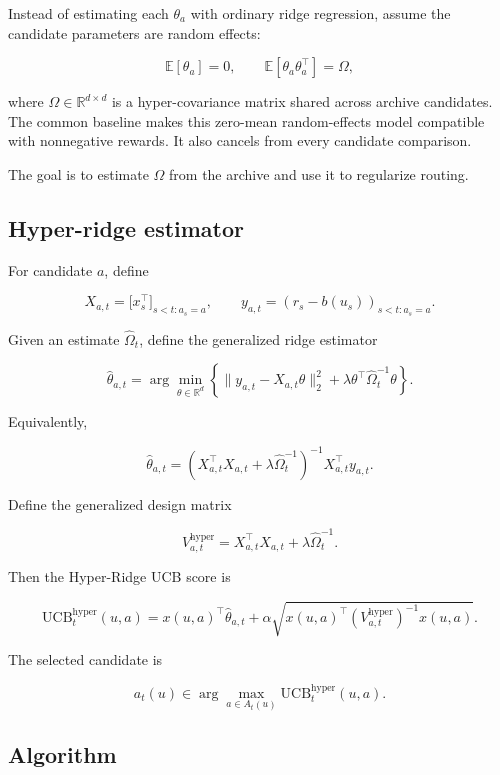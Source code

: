 \documentclass{article} %
\begin{document}
Instead of estimating each $\theta_a$ with ordinary ridge regression, assume
the candidate parameters are random effects:

\[
\mathbb{E}[\theta_a]=0,\qquad
\mathbb{E}[\theta_a\theta_a^\top]=\Omega,
\]

where $\Omega \in \mathbb{R}^{d \times d}$ is a hyper-covariance matrix shared
across archive candidates. The common baseline makes this zero-mean random-effects model compatible with nonnegative rewards. It also cancels from every candidate comparison.

The goal is to estimate $\Omega$ from the archive and use it to regularize
routing.

\subsection{Hyper-ridge estimator}

For candidate $a$, define

\[
X_{a,t} = \bigl[ x_s^\top \bigr]_{s < t : a_s = a}, \qquad
y_{a,t} = (r_s-b(u_s))_{s < t : a_s = a}.
\]

Given an estimate $\widehat{\Omega}_t$, define the generalized ridge estimator

\[
\widehat{\theta}_{a,t}
= \arg\min_{\theta \in \mathbb{R}^d}
\left\{ \| y_{a,t} - X_{a,t}\theta \|_2^2
      + \lambda \theta^\top \widehat{\Omega}_t^{-1} \theta \right\}.
\]

Equivalently,

\[
\widehat{\theta}_{a,t}
= \left( X_{a,t}^\top X_{a,t} + \lambda \widehat{\Omega}_t^{-1} \right)^{-1}
  X_{a,t}^\top y_{a,t}.
\]

Define the generalized design matrix

\[
V_{a,t}^{\mathrm{hyper}} = X_{a,t}^\top X_{a,t} + \lambda \widehat{\Omega}_t^{-1}.
\]

Then the Hyper-Ridge UCB score is

\[
\mathrm{UCB}_t^{\mathrm{hyper}}(u, a)
= x(u, a)^\top \widehat{\theta}_{a,t}
+ \alpha \sqrt{ x(u, a)^\top \left( V_{a,t}^{\mathrm{hyper}} \right)^{-1} x(u, a) }.
\]

The selected candidate is

\[
a_t(u) \in \arg\max_{a \in A_t(u)} \mathrm{UCB}_t^{\mathrm{hyper}}(u, a).
\]


\subsection{Algorithm}
\end{document}
